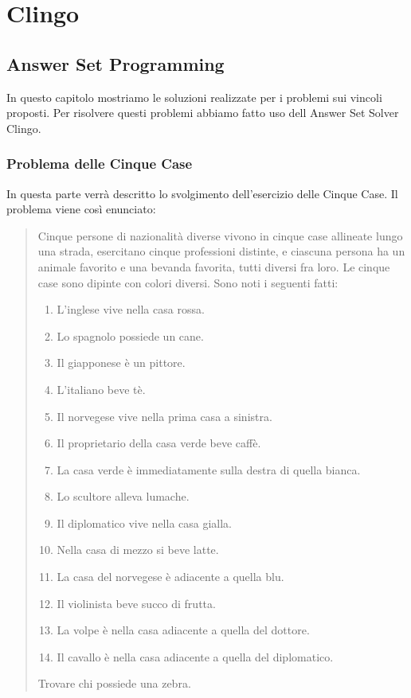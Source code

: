 \part{Clingo}

\chapter{Answer Set Programming}
In questo capitolo mostriamo le soluzioni realizzate per i problemi sui vincoli
proposti. Per risolvere questi problemi abbiamo fatto uso dell Answer Set
Solver Clingo.
\section{Problema delle Cinque Case}
In questa parte verrà descritto lo svolgimento dell'esercizio delle Cinque Case.
Il problema viene così enunciato:
\small{\begin{quote}
    Cinque persone di nazionalità diverse vivono in cinque case allineate lungo una
    strada, esercitano cinque professioni distinte, e ciascuna persona ha un animale favorito e una
    bevanda favorita, tutti diversi fra loro. Le cinque case sono dipinte con colori diversi. Sono noti i
    seguenti fatti:
    \begin{enumerate}
        \item{L'inglese vive nella casa rossa.}
        \item{Lo spagnolo possiede un cane.}
        \item{Il giapponese è un pittore.}
        \item{L'italiano beve tè.}
        \item{Il norvegese vive nella prima casa a sinistra.}
        \item{Il proprietario della casa verde beve caffè.}
        \item{La casa verde è immediatamente sulla destra di quella bianca.}
        \item{Lo scultore alleva lumache.}
        \item{Il diplomatico vive nella casa gialla.}
        \item{Nella casa di mezzo si beve latte.}
        \item{La casa del norvegese è adiacente a quella blu.}
        \item{Il violinista beve succo di frutta.}
        \item{La volpe è nella casa adiacente a quella del dottore.}
        \item{Il cavallo è nella casa adiacente a quella del diplomatico.}
    \end{enumerate}
    Trovare chi possiede una zebra.
\end{quote}}
